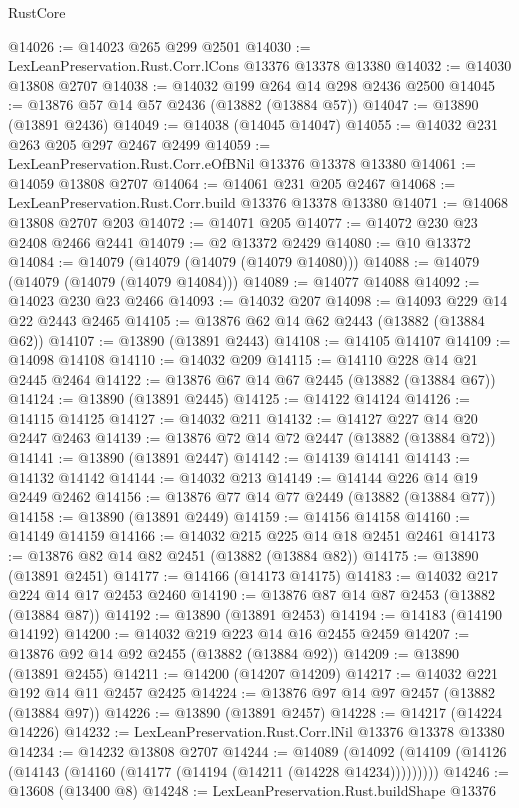 \begin{lexlean}{RustCore}
\begin{coremodule}
@14026 := @14023 @265 @299 @2501
@14030 := LexLeanPreservation.Rust.Corr.lCons @13376 @13378 @13380
@14032 := @14030 @13808 @2707
@14038 := @14032 @199 @264 @14 @298 @2436 @2500
@14045 := @13876 @57 @14 @57 @2436 (@13882 (@13884 @57))
@14047 := @13890 (@13891 @2436)
@14049 := @14038 (@14045 @14047)
@14055 := @14032 @231 @263 @205 @297 @2467 @2499
@14059 := LexLeanPreservation.Rust.Corr.eOfBNil @13376 @13378 @13380
@14061 := @14059 @13808 @2707
@14064 := @14061 @231 @205 @2467
@14068 := LexLeanPreservation.Rust.Corr.build @13376 @13378 @13380
@14071 := @14068 @13808 @2707 @203
@14072 := @14071 @205
@14077 := @14072 @230 @23 @2408 @2466 @2441
@14079 := @2 @13372 @2429
@14080 := @10 @13372
@14084 := @14079 (@14079 (@14079 (@14079 @14080)))
@14088 := @14079 (@14079 (@14079 (@14079 @14084)))
@14089 := @14077 @14088
@14092 := @14023 @230 @23 @2466
@14093 := @14032 @207
@14098 := @14093 @229 @14 @22 @2443 @2465
@14105 := @13876 @62 @14 @62 @2443 (@13882 (@13884 @62))
@14107 := @13890 (@13891 @2443)
@14108 := @14105 @14107
@14109 := @14098 @14108
@14110 := @14032 @209
@14115 := @14110 @228 @14 @21 @2445 @2464
@14122 := @13876 @67 @14 @67 @2445 (@13882 (@13884 @67))
@14124 := @13890 (@13891 @2445)
@14125 := @14122 @14124
@14126 := @14115 @14125
@14127 := @14032 @211
@14132 := @14127 @227 @14 @20 @2447 @2463
@14139 := @13876 @72 @14 @72 @2447 (@13882 (@13884 @72))
@14141 := @13890 (@13891 @2447)
@14142 := @14139 @14141
@14143 := @14132 @14142
@14144 := @14032 @213
@14149 := @14144 @226 @14 @19 @2449 @2462
@14156 := @13876 @77 @14 @77 @2449 (@13882 (@13884 @77))
@14158 := @13890 (@13891 @2449)
@14159 := @14156 @14158
@14160 := @14149 @14159
@14166 := @14032 @215 @225 @14 @18 @2451 @2461
@14173 := @13876 @82 @14 @82 @2451 (@13882 (@13884 @82))
@14175 := @13890 (@13891 @2451)
@14177 := @14166 (@14173 @14175)
@14183 := @14032 @217 @224 @14 @17 @2453 @2460
@14190 := @13876 @87 @14 @87 @2453 (@13882 (@13884 @87))
@14192 := @13890 (@13891 @2453)
@14194 := @14183 (@14190 @14192)
@14200 := @14032 @219 @223 @14 @16 @2455 @2459
@14207 := @13876 @92 @14 @92 @2455 (@13882 (@13884 @92))
@14209 := @13890 (@13891 @2455)
@14211 := @14200 (@14207 @14209)
@14217 := @14032 @221 @192 @14 @11 @2457 @2425
@14224 := @13876 @97 @14 @97 @2457 (@13882 (@13884 @97))
@14226 := @13890 (@13891 @2457)
@14228 := @14217 (@14224 @14226)
@14232 := LexLeanPreservation.Rust.Corr.lNil @13376 @13378 @13380
@14234 := @14232 @13808 @2707
@14244 := @14089
    (@14092 (@14109 (@14126 (@14143 (@14160 (@14177 (@14194 (@14211 (@14228 @14234)))))))))
@14246 := @13608 (@13400 @8)
@14248 := LexLeanPreservation.Rust.buildShape @13376

\end{coremodule}
\end{lexlean}
